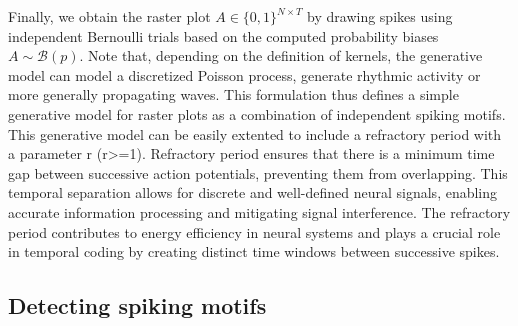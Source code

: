 \documentclass[runningheads]{llncs}
\begin{document}
Finally, we obtain the raster plot $A\in \{0, 1\}^{N\times T}$ by drawing spikes using independent Bernoulli trials based on the computed probability biases $A \sim \mathcal{B}(p)$. Note that, depending on the definition of kernels, the generative model can model a discretized Poisson process, generate rhythmic activity or more generally propagating waves. This formulation thus defines a simple generative model for raster plots as a combination of independent spiking motifs.  This generative model can be easily extented to include a refractory period  with a parameter r (r>=1).  Refractory period ensures that there is a minimum time gap between successive action potentials, preventing them from overlapping. This temporal separation allows for discrete and well-defined neural signals, enabling accurate information processing and mitigating signal interference. The refractory period contributes to energy efficiency in neural systems and plays a crucial role in temporal coding by creating distinct time windows between successive spikes. 

%

%
\subsection{Detecting spiking motifs}
\end{document}
